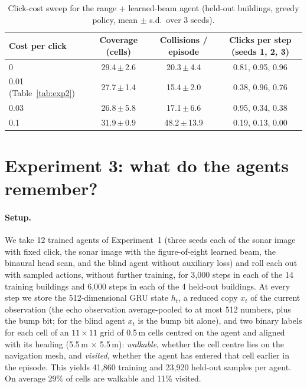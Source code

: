 \documentclass[10pt]{article}
\newcommand{\cell}{0.5\,m}
\newcommand{\pmsd}[2]{#1\,{\scriptsize$\pm$\,#2}}
\begin{document}
\begin{table}[t]
\caption{Click-cost sweep for the range + learned-beam agent (held-out buildings, greedy policy, mean $\pm$ s.d.\ over 3 seeds).}
\label{tab:clickcost}
\centering\small
\begin{tabular}{lccc}
\toprule
Cost per click & Coverage (cells) & Collisions / episode & Clicks per step (seeds 1, 2, 3) \\
\midrule
0 & \pmsd{29.4}{2.6} & \pmsd{20.3}{4.4} & 0.81, 0.95, 0.96 \\
0.01 (Table~\ref{tab:exp2}) & \pmsd{27.7}{1.4} & \pmsd{15.4}{2.0} & 0.38, 0.96, 0.76 \\
0.03 & \pmsd{26.8}{5.8} & \pmsd{17.1}{6.6} & 0.95, 0.34, 0.38 \\
0.1 & \pmsd{31.9}{0.9} & \pmsd{48.2}{13.9} & 0.19, 0.13, 0.00 \\
\bottomrule
\end{tabular}
\end{table}

\section{Experiment 3: what do the agents remember?}
\label{sec:probe}

\paragraph{Setup.} We take 12 trained agents of Experiment~1 (three seeds each of the sonar image with fixed click, the sonar image with the figure-of-eight learned beam, the binaural head scan, and the blind agent without auxiliary loss) and roll each out with sampled actions, without further training, for 3{,}000 steps in each of the 14 training buildings and 6{,}000 steps in each of the 4 held-out buildings. At every step we store the 512-dimensional GRU state $h_t$, a reduced copy $x_t$ of the current observation (the echo observation average-pooled to at most 512 numbers, plus the bump bit; for the blind agent $x_t$ is the bump bit alone), and two binary labels for each cell of an $11\times11$ grid of \cell{} cells centred on the agent and aligned with its heading (5.5\,m $\times$ 5.5\,m): \emph{walkable}, whether the cell centre lies on the navigation mesh, and \emph{visited}, whether the agent has entered that cell earlier in the episode. This yields 41{,}860 training and 23{,}920 held-out samples per agent. On average 29\% of cells are walkable and 11\% visited.
\end{document}
